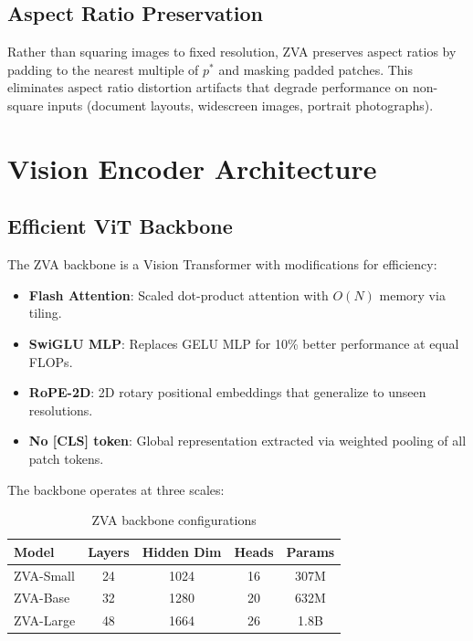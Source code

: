 \documentclass[11pt,a4paper]{article}
\begin{document}
\subsection{Aspect Ratio Preservation}

Rather than squaring images to fixed resolution, ZVA preserves aspect ratios by padding to the nearest multiple of $p^*$ and masking padded patches. This eliminates aspect ratio distortion artifacts that degrade performance on non-square inputs (document layouts, widescreen images, portrait photographs).

\section{Vision Encoder Architecture}

\subsection{Efficient ViT Backbone}

The ZVA backbone is a Vision Transformer with modifications for efficiency:

\begin{itemize}
  \item \textbf{Flash Attention}: Scaled dot-product attention with $O(N)$ memory via tiling.
  \item \textbf{SwiGLU MLP}: Replaces GELU MLP for 10\% better performance at equal FLOPs.
  \item \textbf{RoPE-2D}: 2D rotary positional embeddings that generalize to unseen resolutions.
  \item \textbf{No [CLS] token}: Global representation extracted via weighted pooling of all patch tokens.
\end{itemize}

The backbone operates at three scales:

\begin{table}[H]
\centering
\caption{ZVA backbone configurations}
\label{tab:backbone}
\begin{tabular}{lcccc}
\toprule
Model & Layers & Hidden Dim & Heads & Params \\
\midrule
ZVA-Small & 24 & 1024 & 16 & 307M \\
ZVA-Base & 32 & 1280 & 20 & 632M \\
ZVA-Large & 48 & 1664 & 26 & 1.8B \\
\bottomrule
\end{tabular}
\end{table}
\end{document}
